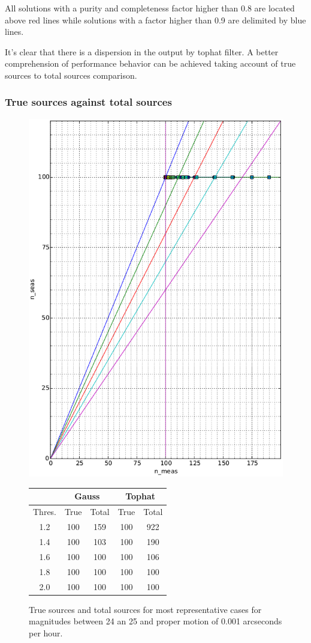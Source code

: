 \documentclass{article}
\begin{document}
All solutions with a purity and completeness factor higher than 0.8 are located above red lines while solutions with a factor higher than 0.9 are delimited by blue lines.

\par It's clear that there is a dispersion in the output by tophat filter. A better comprehension of performance behavior can be achieved taking account of true sources to total sources comparison. 

\subsubsection{True sources against total sources}
\begin{figure}[H]
\centering
\includegraphics[width=.55\linewidth]{images/24_25_0_d.eps}
\qquad
\begin{tabular}[b]{|c|c|c|c|c|}\hline
\multicolumn{1}{|c|}{} & \multicolumn{2}{c|}{Gauss} & \multicolumn{2}{c|}{Tophat} \\
\hline \hline
Thres. & True & Total & True & Total\\
\hline
1.2 & 100 & 159 & 100 & 922\\
\hline
1.4 & 100 & 103 & 100 & 190\\
\hline
1.6 & 100 & 100 & 100 & 106\\
\hline
1.8 & 100 & 100 & 100 & 100\\
\hline
2.0 & 100 & 100 & 100 & 100\\
\hline
\end{tabular}
\captionsetup{labelformat=andtable}
\caption{True sources and total sources for most representative cases for magnitudes between 24 an 25 and proper motion of 0.001 arcseconds per hour.}
\end{figure}
\end{document}
